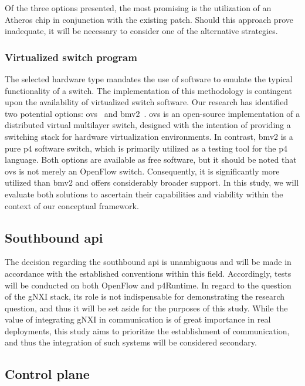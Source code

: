 Of the three options presented, the most promising is the utilization of an Atheros chip in conjunction with the existing patch. Should this approach prove inadequate, it will be necessary to consider one of the alternative strategies.

\subsubsection{Virtualized switch program}
The selected hardware type mandates the use of software to emulate the typical functionality of a switch. The implementation of this methodology is contingent upon the availability of virtualized switch software. Our research has identified two potential options: \gls{ovs}~\cite{noauthor_open_nodate-3} and \gls{bmv2}~\cite{noauthor_p4langbehavioral-model_nodate}.
\gls{ovs} is an open-source implementation of a distributed virtual multilayer switch, designed with the intention of providing a switching stack for hardware virtualization environments. In contrast, \gls{bmv2} is a pure \gls{p4} software switch, which is primarily utilized as a testing tool for the \gls{p4} language. Both options are available as free software, but it should be noted that \gls{ovs} is not merely an OpenFlow switch. Consequently, it is significantly more utilized than \gls{bmv2} and offers considerably broader support.
In this study, we will evaluate both solutions to ascertain their capabilities and viability within the context of our conceptual framework.

\subsection[Southbound API]{Southbound \gls{api}}

The decision regarding the southbound \gls{api} is unambiguous and will be made in accordance with the established conventions within this field. Accordingly, tests will be conducted on both OpenFlow and \gls{p4}Runtime. In regard to the question of the gNXI stack, its role is not indispensable for demonstrating the research question, and thus it will be set aside for the purposes of this study. While the value of integrating gNXI in communication is of great importance in real deployments, this study aims to prioritize the establishment of communication, and thus the integration of such systems will be considered secondary. 

\subsection{Control plane}

